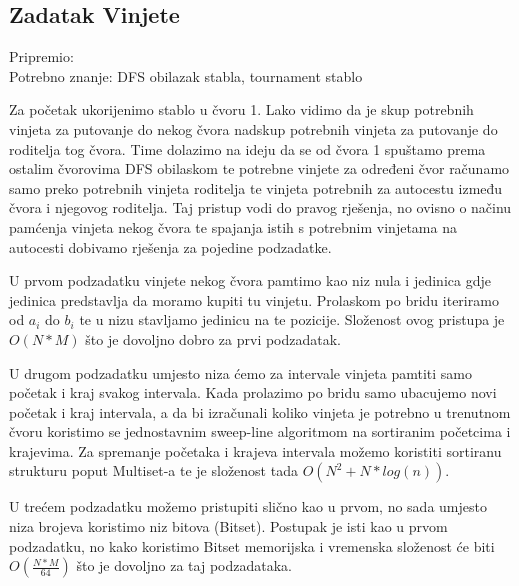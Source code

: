\subsection*{Zadatak Vinjete}
\textsf{Pripremio: }\\
\textsf{Potrebno znanje: DFS obilazak stabla, tournament stablo}

Za početak ukorijenimo stablo u čvoru 1. Lako vidimo da je skup potrebnih vinjeta za putovanje do nekog čvora nadskup potrebnih vinjeta za putovanje do roditelja tog čvora. Time dolazimo na ideju da se od čvora 1 spuštamo prema ostalim čvorovima DFS obilaskom te potrebne vinjete za određeni čvor računamo samo preko potrebnih vinjeta roditelja te vinjeta potrebnih za autocestu između čvora i njegovog roditelja. Taj pristup vodi do pravog rješenja, no ovisno o načinu pamćenja vinjeta nekog čvora te spajanja istih s potrebnim vinjetama na autocesti dobivamo rješenja za pojedine podzadatke.

U prvom podzadatku vinjete nekog čvora pamtimo kao niz nula i jedinica gdje jedinica predstavlja da moramo kupiti tu vinjetu. Prolaskom po bridu iteriramo od $a_i$ do $b_i$ te u nizu stavljamo jedinicu na te pozicije. Složenost ovog pristupa je $O(N * M)$ što je dovoljno dobro za prvi podzadatak.

U drugom podzadatku umjesto niza ćemo za intervale vinjeta pamtiti samo početak i kraj svakog intervala. Kada prolazimo po bridu samo ubacujemo novi početak i kraj intervala, a da bi izračunali koliko vinjeta je potrebno u trenutnom čvoru koristimo se jednostavnim sweep-line algoritmom na sortiranim početcima i krajevima. Za spremanje početaka i krajeva intervala možemo koristiti sortiranu strukturu poput Multiset-a te je složenost tada $O(N^2 + N * log(n))$.

U trećem podzadatku možemo pristupiti slično kao u prvom, no sada umjesto niza brojeva koristimo niz bitova (Bitset). Postupak je isti kao u prvom podzadatku, no kako koristimo Bitset memorijska i vremenska složenost će biti $O(\frac{N * M}{64})$ što je dovoljno za taj podzadataka.

